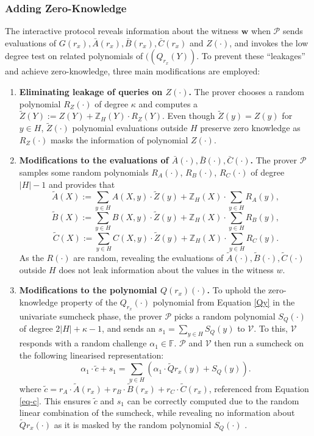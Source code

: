 \subsubsection{Adding Zero-Knowledge}\label{zkpolaris}
The interactive protocol reveals information about the witness $\textbf{w}$ when $\mathcal{P}$ sends evaluations of $G(r_x), \bar{A}(r_x), \bar{B}(r_x), \bar{C}(r_x)$ and $Z(\cdot)$, and invokes the low degree test on related polynomials of $((Q_{r_x}(Y))$. To prevent these ``leakages'' and achieve zero-knowledge, three main modifications are employed:
\begin{enumerate}
	\item \textbf{Eliminating leakage of queries on $Z(\cdot)$.} The prover chooses a random polynomial $R_Z(\cdot)$ of degree $\kappa$ and computes a $\widetilde{Z}(Y):= Z(Y)+\mathbb{Z}_{H}(Y)\cdot R_Z(Y)$. Even though $\widetilde{Z}(y)=Z(y)$ for $y\in H$, $\widetilde{Z}(\cdot)$ polynomial evaluations outside $H$ preserve zero knowledge as $R_Z(\cdot)$ masks the information of polynomial $Z(\cdot)$. 
	\item \textbf{Modifications to the evaluations of $\bar{A}(\cdot), \bar{B}(\cdot), \bar{C}(\cdot)$.} The prover $\mathcal{P}$ samples some random polynomials $R_A(\cdot)$, $R_B(\cdot)$, $R_C(\cdot)$ of degree $|H|-1$ and provides that
	$$\widetilde{A}(X)  := \sum_{y\in H}A(X,y)\cdot\widetilde{Z}(y)+\mathbb{Z}_{H}(X)\cdot\sum_{y\in H}R_A(y),$$
	$$\widetilde{B}(X)  := \sum_{y\in H}B(X,y)\cdot\widetilde{Z}(y)+\mathbb{Z}_{H}(X)\cdot\sum_{y\in H}R_B(y),$$
	$$\widetilde{C}(X)  := \sum_{y\in H}C(X,y)\cdot\widetilde{Z}(y)+\mathbb{Z}_{H}(X)\cdot\sum_{y\in H}R_C(y).$$
	As the $R(\cdot)$ are random, revealing the evaluations of $\widetilde{A}(\cdot), \widetilde{B}(\cdot), \widetilde{C}(\cdot)$ outside $H$ does not leak information about the values in the witness $w$.
	\item \textbf{Modifications to the polynomial $Q(r_x)(\cdot)$.}
	To uphold the zero-knowledge property of the $Q_{r_x}(\cdot)$ polynomial from Equation \eqref{Qy} in the univariate sumcheck phase, the prover $\mathcal{P}$ picks a random polynomial $S_Q(\cdot)$ of degree $2|H|+\kappa-1$, and sends an $s_1=\sum_{y\in H}S_Q(y)$ to $\mathcal{V}$. To this, $\mathcal{V}$ responds with a random challenge $\alpha_1 \in \mathbb{F}$. $\mathcal{P}$ and $\mathcal{V}$ then run a sumcheck on the following linearised representation:
	\[
	\alpha_1\cdot \widetilde{c}+s_1=\sum_{y\in H}(\alpha_1\cdot\widetilde{Q}{r_x}(y)+S_Q(y)).
	\]
	where $\widetilde{c}=r_A\cdot\widetilde{A}(r_x)+r_B\cdot\widetilde{B}(r_x)+r_C\cdot\widetilde{C}(r_x)$, referenced from Equation \eqref{eq-c}.  
	This ensures $\widetilde{c}$ and $s_1$ can be correctly computed due to the random linear combination of the sumcheck, while revealing no information about $\widetilde{Q}{r_x}(\cdot)$ as it is masked by the random polynomial $S_Q(\cdot)$ \cite{Aurora2019}\cite{Zhang2020Virgo} .
\end{enumerate}


